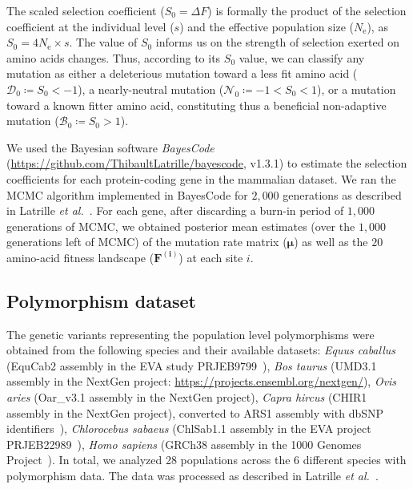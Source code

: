 \documentclass[10pt,letterpaper]{article}
\newcommand{\Ne}{N_{\text{e}}}
\newcommand{\Sphy}{S_{0}}
\newcommand{\SphyDel}{\mathcal{D}_0}
\newcommand{\SphyNeu}{\mathcal{N}_0}
\newcommand{\SphyBen}{\mathcal{B}_0}
\begin{document}
The scaled selection coefficient ($\Sphy = \Delta F$) is formally the product of the selection coefficient at the individual level ($s$) and the effective population size ($\Ne$), as $\Sphy = 4 \Ne \times s$.
The value of $\Sphy$ informs us on the strength of selection exerted on amino acids changes.
Thus, according to its $\Sphy$ value, we can classify any mutation as either a deleterious mutation toward a less fit amino acid ($\SphyDel \coloneqq \Sphy < -1$), a nearly-neutral mutation ($\SphyNeu \coloneqq -1 < \Sphy <1$), or a mutation toward a known fitter amino acid, constituting thus a beneficial non-adaptive mutation ($\SphyBen \coloneqq \Sphy > 1$).

We used the Bayesian software \textit{BayesCode} (\url{https://github.com/ThibaultLatrille/bayescode}, v1.3.1) to estimate the selection coefficients for each protein-coding gene in the mammalian dataset.
We ran the MCMC algorithm implemented in BayesCode for $2,000$ generations as described in Latrille \textit{et al.}~\cite{latrille_genes_2023}.
For each gene, after discarding a burn-in period of $1,000$ generations of MCMC, we obtained posterior mean estimates (over the $1,000$ generations left of MCMC) of the mutation rate matrix ($\bm{\mu}$) as well as the $20$ amino-acid fitness landscape ($\bm{F^{(i)}}$) at each site $i$.

\subsection{Polymorphism dataset}
\label{subsec:polymorphism-dataset}

The genetic variants representing the population level polymorphisms were obtained from the following species and their available datasets: \textit{Equus caballus} (EquCab2 assembly in the EVA study PRJEB9799~\cite{alabri_whole_2020}), \textit{Bos taurus} (UMD3.1 assembly in the NextGen project: \url{https://projects.ensembl.org/nextgen/}), \textit{Ovis aries} (Oar\_v3.1 assembly in the NextGen project), \textit{Capra hircus} (CHIR1 assembly in the NextGen project), converted to ARS1 assembly with dbSNP identifiers~\cite{sherry_dbsnp_2001}), \textit{Chlorocebus sabaeus} (ChlSab1.1 assembly in the EVA project PRJEB22989~\cite{svardal_ancient_2017}), \textit{Homo sapiens} (GRCh38 assembly in the 1000 Genomes Project~\cite{zheng-bradley_alignment_2017}).
In total, we analyzed 28 populations across the 6 different species with polymorphism data.
The data was processed as described in Latrille \textit{et al.}~\cite{latrille_genes_2023}.
\end{document}
